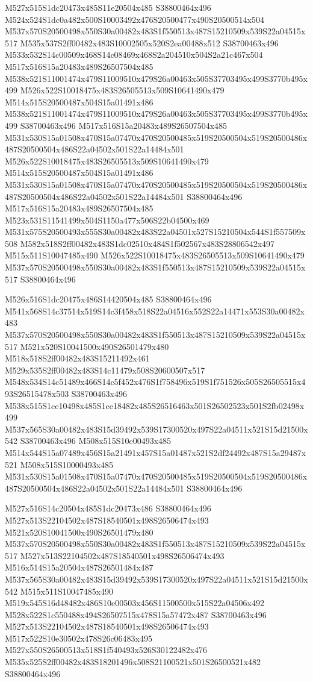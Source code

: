 \documentclass{article}
\begin{document}
\begin{multicols}{2}
M527x515S1dc20473x485S11e20504x485 S38800464x496 M524x524S1dc0a482x500S10003492x476S20500477x490S20500514x504 M537x570S20500498x550S30a00482x483S1f550513x487S15210509x539S22a04515x517 M535x537S2ff00482x483S10002505x520S2ea00488x512 S38700463x496 M533x532S14c00509x468S14c08469x468S2a204510x504S2a21c467x504 M517x516S15a20483x489S26507504x485 M538x521S11001474x479S11009510x479S26a00463x505S37703495x499S3770b495x499 M526x522S10018475x483S26505513x509S10641490x479 M514x515S20500487x504S15a01491x486 M538x521S11001474x479S11009510x479S26a00463x505S37703495x499S3770b495x499 S38700463x496 M517x516S15a20483x489S26507504x485 M531x530S15a01508x470S15a07470x470S20500485x519S20500504x519S20500486x487S20500504x486S22a04502x501S22a14484x501 M526x522S10018475x483S26505513x509S10641490x479 M514x515S20500487x504S15a01491x486 M531x530S15a01508x470S15a07470x470S20500485x519S20500504x519S20500486x487S20500504x486S22a04502x501S22a14484x501 S38800464x496 M517x516S15a20483x489S26507504x485 M523x531S11541499x504S1150a477x506S22b04500x469 M531x575S20500493x555S30a00482x483S22a04501x527S15210504x544S1f557509x508 M582x518S2ff00482x483S1dc02510x484S1f502567x483S28806542x497 M515x511S10047485x490 M526x522S10018475x483S26505513x509S10641490x479 M537x570S20500498x550S30a00482x483S1f550513x487S15210509x539S22a04515x517 S38800464x496

M526x516S1dc20475x486S14420504x485 S38800464x496 M541x568S14c37514x519S14c3f458x518S22a04516x552S22a14471x553S30a00482x483 M537x570S20500498x550S30a00482x483S1f550513x487S15210509x539S22a04515x517 M521x520S10041500x490S26501479x480 M518x518S2ff00482x483S15211492x461 M529x535S2ff00482x483S14c11479x508S20600507x517 M548x534S14c51489x466S14c5f452x476S1f758496x519S1f751526x505S26505515x493S26515478x503 S38700463x496 M538x515S1ce10498x485S1ce18482x485S26516463x501S26502523x501S2fb02498x499 M537x565S30a00482x483S15d39492x539S17300520x497S22a04511x521S15d21500x542 S38700463x496 M508x515S10e00493x485 M514x544S15a07489x456S15a21491x457S15a01487x521S2df24492x487S15a29487x521 M508x515S10000493x485 M531x530S15a01508x470S15a07470x470S20500485x519S20500504x519S20500486x487S20500504x486S22a04502x501S22a14484x501 S38800464x496

M527x516S14c20504x485S1dc20473x486 S38800464x496 M527x513S22104502x487S18540501x498S26506474x493 M521x520S10041500x490S26501479x480 M537x570S20500498x550S30a00482x483S1f550513x487S15210509x539S22a04515x517 M527x513S22104502x487S18540501x498S26506474x493 M516x514S15a20504x487S26501484x487 M537x565S30a00482x483S15d39492x539S17300520x497S22a04511x521S15d21500x542 M515x511S10047485x490 M519x545S16d48482x486S10e00503x456S11500500x515S22a04506x492 M528x522S1c550488x494S26507515x478S15a57472x487 S38700463x496 M527x513S22104502x487S18540501x498S26506474x493 M517x522S10e30502x478S26c06483x495 M527x550S26500513x518S1f540493x526S30122482x476 M535x525S2ff00482x483S18201496x508S21100521x501S26500521x482 S38800464x496


\end{multicols}
\end{document}
